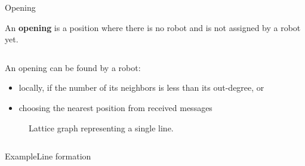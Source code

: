 \documentclass[10pt]{beamer}
\begin{document}
\begin{frame}{Opening}{}
  \begin{definition}
    \small{An \textbf{opening} is a position where there is no robot and is
    not assigned by a robot yet.}
   \end{definition}
   \begin{columns}[T] %
   \begin{column}{.45\textwidth}
     An opening can be found by a robot:
     \begin{itemize}
     \item \small{locally, if the number of its neighbors is less than its
       out-degree, or}
     \item \small{choosing the nearest position from received messages}
     \end{itemize}
     \begin{figure}
       \centering
       \caption{\footnotesize{Lattice graph representing a single line.}}
     \end{figure}
    \end{column}%
    \begin{column}{.5\textwidth}
      
    \end{column}%
  \end{columns}
\end{frame}

\begin{frame}{Example}{Line formation}
  \begin{center}
  \end{center}
\end{frame}
\end{document}
